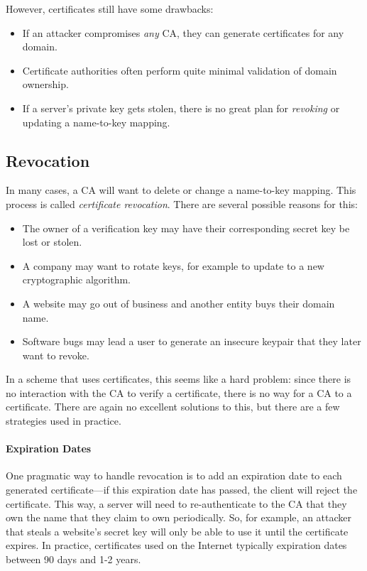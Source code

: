 However, certificates still have some drawbacks:
\begin{itemize}[noitemsep]
  \item If an attacker compromises \emph{any} CA, they can generate certificates for any domain.
	\item Certificate authorities often perform quite minimal validation of domain ownership.
	\item If a server's private key gets stolen, 
        there is no great plan for \emph{revoking} or updating a name-to-key mapping.
\end{itemize}

\subsection{Revocation}
In many cases, a CA will want to delete or change a name-to-key mapping.
This process is called \emph{certificate revocation}.
There are several possible reasons for this:
\begin{itemize}[noitemsep]
	\item The owner of a verification key may have their corresponding secret key
        be lost or stolen.
	\item A company may want to rotate keys, 
        for example to update to a new cryptographic algorithm.
	\item A website may go out of business and another entity buys their domain name.
	\item Software bugs may lead a user to generate an
        insecure keypair that they later want to revoke.\autocite{yilek2009private,nemec2017return}
\end{itemize}

In a scheme that uses certificates, this seems like a hard problem: since there is no interaction with the CA to verify a certificate, there is no way for a CA to  a certificate. There are again no excellent solutions to this, but there are a few strategies used in practice.

\paragraph{Expiration Dates}
One pragmatic way to handle revocation is to add
an expiration date to each generated
certificate---if this expiration date has passed,
the client will reject the certificate. This way,
a server will need to re-authenticate to the CA
that they own the name that they claim to own
periodically. So, for example, an attacker that steals
a website's secret key will only be able to use it 
until the certificate expires.
In practice, certificates used on the Internet
typically expiration dates between 90 days 
and 1-2 years.

